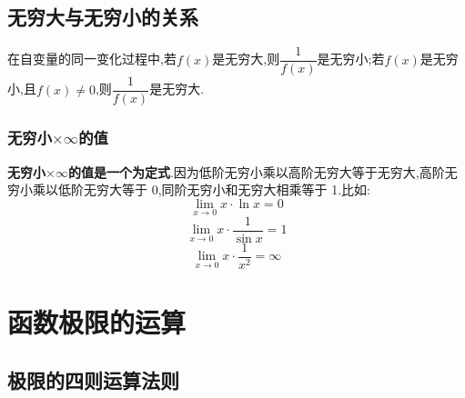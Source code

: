 \documentclass[8pt a4paper, oneside, UTF8]{ctexbook}
\begin{document}
\begin{sloppypar}
    \subsection{无穷大与无穷小的关系}
    在自变量的同一变化过程中,若$f(x)$是无穷大,则$\dfrac{1}{f(x)}$是无穷小;若$f(x)$是无穷小,且$f(x)\neq 0$,则$\dfrac{1}{f(x)}$是无穷大.
    \subsubsection{无穷小$\times \infty$的值}
    \textbf{无穷小$\times \infty$的值是一个为定式}.因为低阶无穷小乘以高阶无穷大等于无穷大,高阶无穷小乘以低阶无穷大等于 0,同阶无穷小和无穷大相乘等于 1.比如:
    $$
        \lim_{x\to0}x\cdot \ln x=0
    $$
    $$
        \lim_{x\to0}x\cdot\dfrac1{\sin x}=1
    $$
    $$
        \lim_{x\to0}x\cdot\dfrac1{x^2}=\infty
    $$
    \section{函数极限的运算}
    \subsection{极限的四则运算法则}\label{jxdsz1}

\end{sloppypar}
\end{document}
